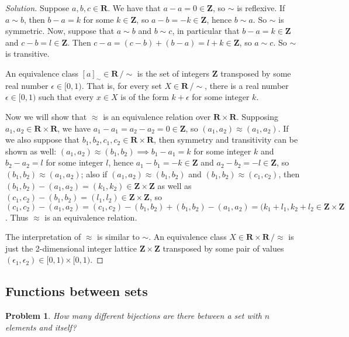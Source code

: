 \documentclass[fontsize=14pt]{scrartcl}
\newtheorem{problem-internal}{Problem}[subsection]
\newenvironment{problem}{
  \medskip
  \begin{problem-internal}
}{
  \end{problem-internal}
}
\newenvironment{solution}{
  \begin{proof}[Solution]
  \vspace{-8px}
  \setlength{\parskip}{4px}
  \setlength{\parindent}{0px}
}{
  \end{proof}
}
\begin{document}
\begin{solution}
Suppose $a,b,c\in\mathbf{R}$. We have that $a-a=0\in\mathbf{Z}$, so $\sim$ is
reflexive. If $a\sim b$, then $b-a=k$ for some $k\in\mathbf{Z}$, so
$a-b=-k\in\mathbf{Z}$, hence $b\sim a$. So $\sim$ is symmetric. Now, suppose that
$a\sim b$ and $b\sim c$, in particular that $b-a=k\in\mathbf{Z}$ and
$c-b=l\in\mathbf{Z}$. Then $c-a=(c-b) + (b-a) = l+k\in\mathbf{Z}$, so $a\sim c$.
So $\sim$ is transitive.

An equivalence class $[a]_{\sim}\in\mathbf{R}\,/\!\sim$ is the set of integers
$\mathbf{Z}$ transposed by some real number $\epsilon\in[0,1)$. That is, for
every set $X\in\mathbf{R}\,/\!\sim$, there is a real number $\epsilon\in[0,1)$
such that every $x\in X$ is of the form $k+\epsilon$ for some integer $k$.

Now we will show that $\approx$ is an equivalence relation over
$\mathbf{R}\times\mathbf{R}$. Supposing $a_1,a_2\in\mathbf{R}\times\mathbf{R}$,
we have $a_1-a_1=a_2-a_2=0\in\mathbf{Z}$, so $(a_1,a_2)\approx(a_1,a_2)$. If we
also suppose that $b_1,b_2,c_1,c_2\in\mathbf{R}\times\mathbf{R}$, then symmetry
and transitivity can be shown as well: $(a_1,a_2)\approx(b_1,b_2)\implies
b_1-a_1=k$ for some integer $k$ and $b_2-a_2=l$ for some integer $l$, hence
$a_1-b_1=-k\in\mathbf{Z}$ and $a_2-b_2=-l\in\mathbf{Z}$, so
$(b_1,b_2)\approx(a_1,a_2)$; also if $(a_1,a_2)\approx(b_1,b_2)$ and
$(b_1,b_2)\approx(c_1,c_2)$, then
$(b_1,b_2)-(a_1,a_2)=(k_1,k_2)\in\mathbf{Z}\times\mathbf{Z}$ as well as
$(c_1,c_2)-(b_1,b_2)=(l_1,l_2)\in\mathbf{Z}\times\mathbf{Z}$, so $(c_1,c_2) -
(a_1,a_2) = (c_1,c_2) - (b_1,b_2) + (b_1,b_2) - (a_1,a_2) = (k_1+l_1,
k_2+l_2\in\mathbf{Z}\times\mathbf{Z}$. Thus $\approx$ is an equivalence
relation.

The interpretation of $\approx$ is similar to $\sim$. An equivalence class
$X\in\mathbf{R}\times\mathbf{R}\,/\approx$ is just the 2-dimensional integer
lattice $\mathbf{Z}\times\mathbf{Z}$ transposed by some pair of values
$(\epsilon_1,\epsilon_2)\in[0,1)\times[0,1)$.
\end{solution}



\subsection{Functions between sets}


\begin{problem}
How many different bijections are there between a set with $n$ elements
and itself?
\end{problem}
\end{document}
